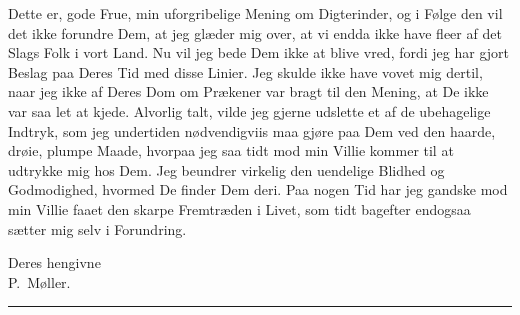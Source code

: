 \documentclass[12pt]{article}
\newcommand{\qvbreak}{\par\medskip\begin{center}\rule{0.32\textwidth}{0.4pt}\end{center}\medskip}
\begin{document}
Dette er, gode Frue, min uforgribelige Mening om Digterinder, og i Følge den vil
det ikke forundre Dem, at jeg glæder mig over, at vi endda ikke have fleer af det
Slags Folk i vort Land. Nu vil jeg bede Dem ikke at blive vred, fordi jeg har
gjort Beslag paa Deres Tid med disse Linier. Jeg skulde ikke have vovet mig
dertil, naar jeg ikke af Deres Dom om Prækener var bragt til den Mening, at De
ikke var saa let at kjede. Alvorlig talt, vilde jeg gjerne udslette et af de
ubehagelige Indtryk, som jeg undertiden nødvendigviis maa gjøre paa Dem ved den
haarde, drøie, plumpe Maade, hvorpaa jeg saa tidt mod min Villie kommer til at
udtrykke mig hos Dem. Jeg beundrer virkelig den uendelige Blidhed og Godmodighed,
hvormed De finder Dem deri. Paa nogen Tid har jeg gandske mod min Villie faaet den
skarpe Fremtræden i Livet, som tidt bagefter endogsaa sætter mig selv i Forundring.

\begin{flushright}
Deres hengivne\\
P.~Møller.
\end{flushright}

\qvbreak
\end{document}
